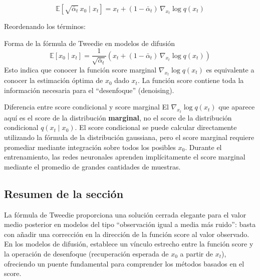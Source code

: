$$\mathbb{E}[\sqrt{\bar{\alpha}_t}\, x_0 \mid x_t] = x_t + (1-\bar{\alpha}_t)\, \nabla_{x_t} \log q(x_t)$$

Reordenando los términos:

\begin{importantbox}{Forma de la fórmula de Tweedie en modelos de difusión}
$$\mathbb{E}[x_0 \mid x_t] = \frac{1}{\sqrt{\bar{\alpha}_t}} \left(x_t + (1-\bar{\alpha}_t)\, \nabla_{x_t} \log q(x_t)\right)$$
Esto indica que conocer la función score marginal $\nabla_{x_t} \log q(x_t)$ es equivalente a conocer la estimación óptima de $x_0$ dado $x_t$. La función score contiene toda la información necesaria para el ``desenfoque'' (denoising).
\end{importantbox}

\begin{warningbox}{Diferencia entre score condicional y score marginal}
El $\nabla_{x_t} \log q(x_t)$ que aparece aquí es el score de la distribución \textbf{marginal}, no el score de la distribución condicional $q(x_t \mid x_0)$. El score condicional se puede calcular directamente utilizando la fórmula de la distribución gaussiana, pero el score marginal requiere promediar mediante integración sobre todos los posibles $x_0$. Durante el entrenamiento, las redes neuronales aprenden implícitamente el score marginal mediante el promedio de grandes cantidades de muestras.
\end{warningbox}

\subsection{Resumen de la sección}

La fórmula de Tweedie proporciona una solución cerrada elegante para el valor medio posterior en modelos del tipo ``observación igual a media más ruido'': basta con añadir una corrección en la dirección de la función score al valor observado. En los modelos de difusión, establece un vínculo estrecho entre la función score y la operación de desenfoque (recuperación esperada de $x_0$ a partir de $x_t$), ofreciendo un puente fundamental para comprender los métodos basados en el score.
